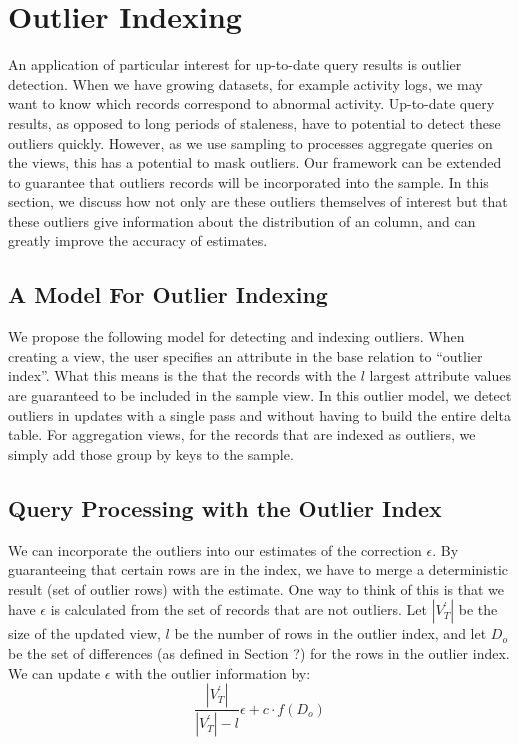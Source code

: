 \section{Outlier Indexing}

An application of particular interest for up-to-date query results
is outlier detection. When we have growing datasets, for example activity
logs, we may want to know which records correspond to abnormal activity.
Up-to-date query results, as opposed to long periods of staleness,
have to potential to detect these outliers quickly. However, as we
use sampling to processes aggregate queries on the views, this has
a potential to mask outliers. Our framework can be extended to guarantee
that outliers records will be incorporated into the sample. In this
section, we discuss how not only are these outliers themselves of
interest but that these outliers give information about the distribution
of an column, and can greatly improve the accuracy of estimates.


\subsection{A Model For Outlier Indexing}

We propose the following model for detecting and indexing outliers.
When creating a view, the user specifies an attribute in the base
relation to ``outlier index''. What this means is the that the records
with the $l$ largest attribute values are guaranteed to be included
in the sample view. In this outlier model, we detect outliers in updates
with a single pass and without having to build the entire delta table.
For aggregation views, for the records that are indexed as outliers,
we simply add those group by keys to the sample.


\subsection{Query Processing with the Outlier Index}

We can incorporate the outliers into our estimates of the correction
$\epsilon$. By guaranteeing that certain rows are in the index, we
have to merge a deterministic result (set of outlier rows) with the
estimate. One way to think of this is that we have $\epsilon$ is
calculated from the set of records that are not outliers. Let $|V_{T}^{'}|$
be the size of the updated view, $l$ be the number of rows in the
outlier index, and let $D_{o}$ be the set of differences (as defined
in Section ?) for the rows in the outlier index. We can update $\epsilon$
with the outlier information by:
\[
\frac{|V_{T}^{'}|}{|V_{T}^{'}|-l}\epsilon+c\cdot f(D_{o})
\]


